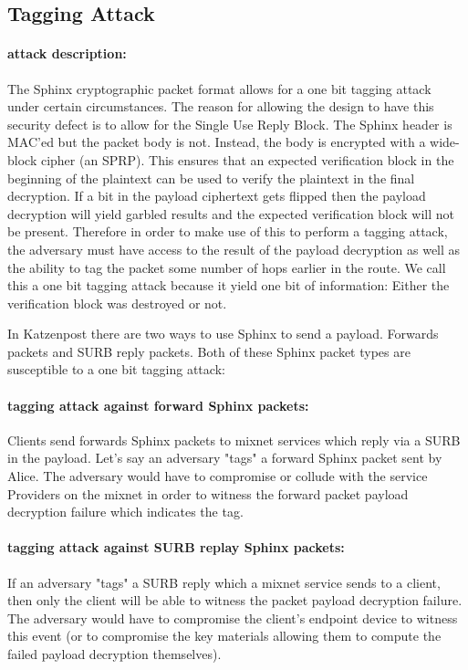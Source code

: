 \documentclass{article}
\begin{document}
\subsection{Tagging Attack}

\paragraph{attack description:} The Sphinx cryptographic packet format allows for a
one bit tagging attack under certain circumstances. The reason
for allowing the design to have this security defect is to allow for the
Single Use Reply Block. The Sphinx header is MAC’ed but
the packet body is not. Instead, the body is encrypted with a
wide-block cipher (an SPRP). This ensures that an expected
verification block in the beginning of the plaintext can be used to verify the
plaintext in the final decryption. If a bit in the payload ciphertext gets flipped then the
payload decryption will yield garbled results and the expected verification block will not be present. Therefore in order to make
use of this to perform a tagging attack, the adversary must
have access to the result of the payload decryption
as well as the ability to tag the packet some number of hops
earlier in the route. We call this a one bit tagging attack because it yield one bit of information: Either the verification block was destroyed or not.

In Katzenpost there are two ways to use Sphinx to send a payload. Forwards packets and SURB reply packets. Both of these Sphinx packet types are susceptible to a one bit tagging attack:

\paragraph{tagging attack against forward Sphinx packets:} Clients send forwards Sphinx packets
to mixnet services which reply via a SURB in the payload. Let's say an adversary "tags" a forward Sphinx packet sent by Alice. The adversary would have to compromise or collude with
the service Providers on the mixnet in order to witness the forward packet payload decryption
failure which indicates the tag.

\paragraph{tagging attack against SURB replay Sphinx packets:} If an adversary "tags" a SURB reply which a mixnet service sends to a client, then only the client will be able to witness the packet payload decryption failure. The adversary would have to compromise the client's endpoint device to witness this event (or to compromise the key materials allowing them to compute the failed payload decryption themselves).
\end{document}
